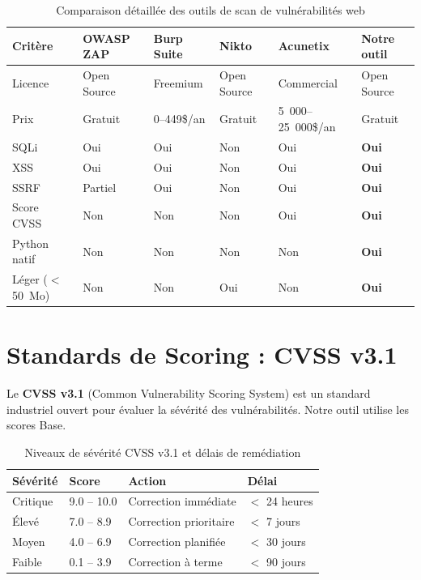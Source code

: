 \documentclass[12pt,a4paper]{report}
\newcommand{\hdr}[1]{\cellcolor{gray!15}\textbf{#1}}
\newcommand{\rowA}{\rowcolor{gray!8}}
\newcommand{\rowB}{\rowcolor{white}}
\begin{document}
\begin{table}[h!]
\centering
\caption{Comparaison détaillée des outils de scan de vulnérabilités web}
\begin{tabular}{p{2.5cm}p{1.8cm}p{1.8cm}p{1.4cm}p{1.8cm}p{2cm}}
\toprule
\hdr{Critère} & \hdr{OWASP ZAP} & \hdr{Burp Suite} & \hdr{Nikto} & \hdr{Acunetix} & \hdr{Notre outil} \\
\midrule
Licence        & Open Source & Freemium    & Open Source & Commercial        & Open Source \\
\rowA Prix     & Gratuit     & 0–449\$/an  & Gratuit     & 5~000–25~000\$/an & Gratuit \\
SQLi           & Oui         & Oui         & Non         & Oui               & \textbf{Oui} \\
\rowA XSS      & Oui         & Oui         & Non         & Oui               & \textbf{Oui} \\
SSRF           & Partiel     & Oui         & Non         & Oui               & \textbf{Oui} \\
\rowA Score CVSS & Non       & Non         & Non         & Oui               & \textbf{Oui} \\
Python natif   & Non         & Non         & Non         & Non               & \textbf{Oui} \\
\rowA Léger ($<$50~Mo) & Non & Non        & Oui         & Non               & \textbf{Oui} \\
\bottomrule
\end{tabular}
\end{table}

\section{Standards de Scoring : CVSS v3.1}

Le \textbf{CVSS v3.1} (Common Vulnerability Scoring System) est un standard industriel ouvert
pour évaluer la sévérité des vulnérabilités. Notre outil utilise les scores Base.

\begin{table}[h!]
\centering
\caption{Niveaux de sévérité CVSS v3.1 et délais de remédiation}
\begin{tabular}{p{2cm}p{2.5cm}p{4cm}p{3.5cm}}
\toprule
\hdr{Sévérité} & \hdr{Score} & \hdr{Action} & \hdr{Délai} \\
\midrule
\rowcolor{gray!15} Critique & 9.0 – 10.0 & Correction immédiate & $<$ 24 heures \\
\rowcolor{gray!8} Élevé   & 7.0 – 8.9  & Correction prioritaire & $<$ 7 jours \\
\rowcolor{white} Moyen  & 4.0 – 6.9  & Correction planifiée & $<$ 30 jours \\
\rowB Faible                & 0.1 – 3.9  & Correction à terme & $<$ 90 jours \\
\bottomrule
\end{tabular}
\end{table}
\end{document}
